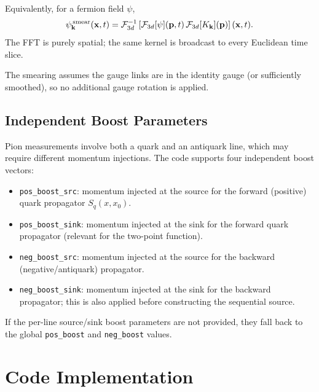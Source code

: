 \documentclass[11pt,a4paper]{article}
\newcommand{\Sq}{S_{q}}
\begin{document}
Equivalently, for a fermion field \(\psi\),
\begin{equation}
  \psi^{\,{\rm smear}}_{\mathbf{k}}(\mathbf{x},t)
  =
  \mathcal{F}^{-1}_{3d}
  \left[
    \mathcal{F}_{3d}[\psi](\mathbf{p},t)\,
    \mathcal{F}_{3d}[K_{\mathbf{k}}](\mathbf{p})
  \right](\mathbf{x},t).
\label{eq:fft_smearing}
\end{equation}
The FFT is purely spatial; the same kernel is broadcast to every Euclidean time
slice.

The smearing assumes the gauge links are in the identity gauge (or sufficiently
smoothed), so no additional gauge rotation is applied.

\subsection{Independent Boost Parameters}

Pion measurements involve both a quark and an antiquark line, which may require
different momentum injections.  The code supports four independent boost
vectors:

\begin{itemize}[nosep]
  \item \texttt{pos\_boost\_src}: momentum injected at the source for the
        forward (positive) quark propagator \(\Sq(x, x_0)\).
  \item \texttt{pos\_boost\_sink}: momentum injected at the sink for the forward
        quark propagator (relevant for the two-point function).
  \item \texttt{neg\_boost\_src}: momentum injected at the source for the
        backward (negative/antiquark) propagator.
  \item \texttt{neg\_boost\_sink}: momentum injected at the sink for the
        backward propagator; this is also applied before constructing the
        sequential source.
\end{itemize}

If the per-line source/sink boost parameters are not provided, they fall back
to the global \texttt{pos\_boost} and \texttt{neg\_boost} values.


\section{Code Implementation}
\end{document}
